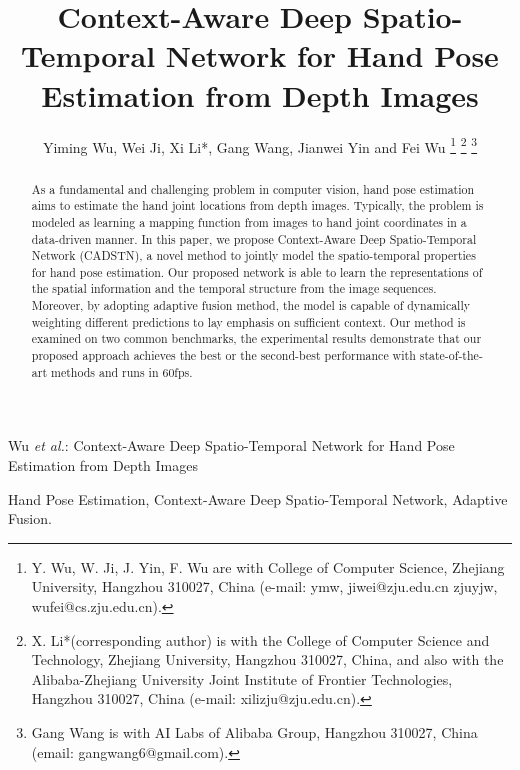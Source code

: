 \documentclass[journal,comsoc]{IEEEtran}
\begin{document}
\title{Context-Aware Deep Spatio-Temporal Network for Hand Pose Estimation from Depth Images}

\author{{Yiming Wu, Wei Ji, Xi Li*, Gang Wang, Jianwei Yin and Fei Wu}%
\thanks{Y. Wu, W. Ji, J. Yin, F. Wu are with College of Computer Science, Zhejiang University, Hangzhou 310027, China (e-mail: ymw, jiwei@zju.edu.cn zjuyjw, wufei@cs.zju.edu.cn).}
\thanks{X. Li*(corresponding author) is with the College of Computer Science and Technology, Zhejiang University, Hangzhou 310027, China, and also with the Alibaba-Zhejiang University Joint Institute of Frontier Technologies, Hangzhou 310027, China (e-mail: xilizju@zju.edu.cn).}
\thanks{Gang Wang is with AI Labs of Alibaba Group, Hangzhou 310027, China (email: gangwang6@gmail.com).}}

%
{Wu \MakeLowercase{\textit{et al.}}: Context-Aware Deep Spatio-Temporal Network for Hand Pose Estimation from Depth Images}

\maketitle

\begin{abstract}
As a fundamental and challenging problem in computer vision, hand pose estimation
aims to estimate the hand joint locations from depth images. Typically, the problem is modeled as
learning a mapping function from images to hand joint coordinates in a data-driven manner.
In this paper, we propose Context-Aware Deep Spatio-Temporal Network (CADSTN), a novel method to jointly
model the spatio-temporal properties for hand pose estimation. Our proposed network is able to learn the
representations of the spatial information
and the temporal structure from the image sequences. Moreover, by adopting adaptive fusion method,
the model is capable of dynamically weighting different predictions to lay emphasis on sufficient context.
Our method is examined on two common benchmarks,
the experimental results demonstrate that our proposed approach achieves
the best or the second-best performance with state-of-the-art methods and runs in 60fps.
\end{abstract}
\begin{IEEEkeywords}
Hand Pose Estimation, Context-Aware Deep Spatio-Temporal Network, Adaptive Fusion.
\end{IEEEkeywords}
\end{document}
